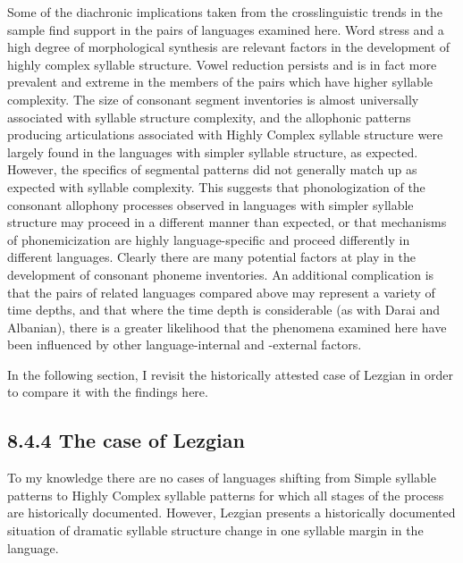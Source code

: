   Some of the diachronic implications taken from the crosslinguistic trends in the sample find support in the pairs of languages examined here. Word stress and a high degree of morphological synthesis are relevant factors in the development of highly complex syllable structure. Vowel reduction persists and is in fact more prevalent and extreme in the members of the pairs which have higher syllable complexity. The size of consonant segment inventories is almost universally associated with syllable structure complexity, and the allophonic patterns producing articulations associated with Highly Complex syllable structure were largely found in the languages with simpler syllable structure, as expected. However, the specifics of segmental patterns did not generally match up as expected with syllable complexity. This suggests that phonologization of the consonant allophony processes observed in languages with simpler syllable structure may proceed in a different manner than expected, or that mechanisms of phonemicization are highly language-specific and proceed differently in different languages. Clearly there are many potential factors at play in the development of consonant phoneme inventories. An additional complication is that the pairs of related languages compared above may represent a variety of time depths, and that where the time depth is considerable (as with Darai and Albanian), there is a greater likelihood that the phenomena examined here have been influenced by other language-internal and -external factors.



  In the following section, I revisit the historically attested case of Lezgian in order to compare it with the findings here.


\subsection{8.4.4 The case of Lezgian}

  To my knowledge there are no cases of languages shifting from Simple syllable patterns to Highly Complex syllable patterns for which all stages of the process are historically documented. However, Lezgian presents a historically documented situation of dramatic syllable structure change in one syllable margin in the language.



